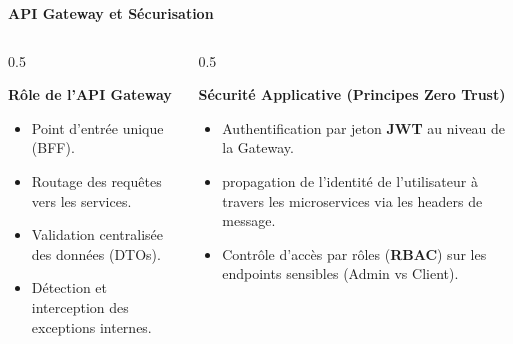 \documentclass[10pt,aspectratio=169]{beamer}
\begin{document}
\begin{frame}{\textbf{API Gateway et Sécurisation}}
    \begin{columns}
        \begin{column}{0.5\textwidth}
            \begin{block}{\textbf{Rôle de l'API Gateway}}
                \begin{itemize}
                    \item Point d'entrée unique (BFF).
                    \item Routage des requêtes vers les services.
                    \item Validation centralisée des données (DTOs).
                    \item Détection et interception des exceptions internes.
                \end{itemize}
            \end{block}
        \end{column}
        \begin{column}{0.5\textwidth}
            \begin{block}{\textbf{Sécurité Applicative (Principes Zero Trust)}}
                \begin{itemize}
                    \item Authentification par jeton \textbf{JWT} au niveau de la Gateway.
                    \item propagation de l'identité de l'utilisateur à travers les microservices via les headers de message.
                    \item Contrôle d'accès par rôles (\textbf{RBAC}) sur les endpoints sensibles (Admin vs Client).
                \end{itemize}
            \end{block}
        \end{column}
    \end{columns}
\end{frame}
\end{document}
